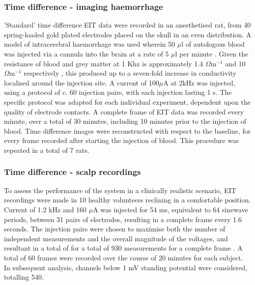 \subsubsection{Time difference - imaging haemorrhage}
'Standard' time difference EIT data were recorded in an anesthetised rat, from 40 spring-loaded gold plated electrodes placed on the skull in an even distribution. A model of intracerebral haemorrhage was used wherein 50 $\mu$l of autologous blood was injected via a cannula into the brain at a rate of 5 $\mu$l per minute \cite{Dowrick_2016}. Given the resistance of blood and grey matter at 1 Khz is approximately 1.4 $\Omega {\text{m}}^{-1}$ and 10 $\Omega {\text{m}}^{-1}$ respectively \cite{Gabriel_2009}, this produced up to a seven-fold increase in conductivity localised around the injection site. A current of 100\( \mu \)A at 2kHz was injected, using a protocol of c. 60 injection pairs, with each injection lasting 1 s. The specific protocol was adapted for each individual experiment, dependent upon the quality of electrode contacts. A complete frame of EIT data was recorded every minute, over a total of 30 minutes, including 10 minutes prior to the injection of blood.  Time difference images were reconstructed with respect to the baseline, for every frame recorded after starting the injection of blood. This procedure was repeated in a total of 7 rats. 

\subsubsection{Time difference - scalp recordings}
\label{methodsTD}
To assess the performance of the system in a clinically realistic scenario, EIT recordings were made in 10 healthy volunteers reclining in a comfortable position. Current of 1.2 kHz and 160 $\mu$A was injected for 54 ms, equivalent to 64 sinewave periods, between 31 pairs of electrodes, resulting in a complete frame every 1.6 seconds. The injection pairs were chosen to maximise both the number of independent measurements and the overall magnitude of the voltages, and resultant in a total of for a total of 930 measurements for a complete frame \cite{Malone2014a}. A total of 60 frames were recorded over the course of 20 minutes for each subject. In subsequent analysis, channels below 1 mV standing potential were considered, totalling 540. 